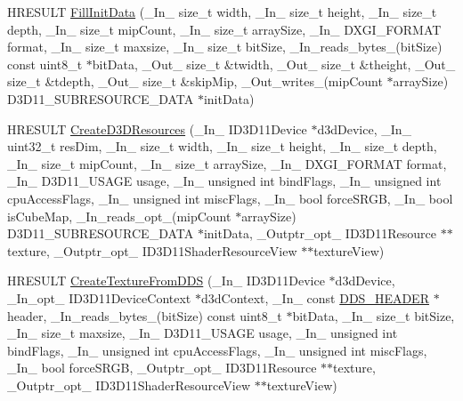 \begin{DoxyCompactItemize}
\item 
H\+R\+E\+S\+U\+LT \mbox{\hyperlink{namespaceanonymous__namespace_02dds__loader_8cpp_03_a1e6625f0f160c3b83ad3b703589fc33d}{Fill\+Init\+Data}} (\+\_\+\+In\+\_\+ size\+\_\+t width, \+\_\+\+In\+\_\+ size\+\_\+t height, \+\_\+\+In\+\_\+ size\+\_\+t depth, \+\_\+\+In\+\_\+ size\+\_\+t mip\+Count, \+\_\+\+In\+\_\+ size\+\_\+t array\+Size, \+\_\+\+In\+\_\+ D\+X\+G\+I\+\_\+\+F\+O\+R\+M\+AT format, \+\_\+\+In\+\_\+ size\+\_\+t maxsize, \+\_\+\+In\+\_\+ size\+\_\+t bit\+Size, \+\_\+\+In\+\_\+reads\+\_\+bytes\+\_\+(bit\+Size) const uint8\+\_\+t $\ast$bit\+Data, \+\_\+\+Out\+\_\+ size\+\_\+t \&twidth, \+\_\+\+Out\+\_\+ size\+\_\+t \&theight, \+\_\+\+Out\+\_\+ size\+\_\+t \&tdepth, \+\_\+\+Out\+\_\+ size\+\_\+t \&skip\+Mip, \+\_\+\+Out\+\_\+writes\+\_\+(mip\+Count $\ast$array\+Size) D3\+D11\+\_\+\+S\+U\+B\+R\+E\+S\+O\+U\+R\+C\+E\+\_\+\+D\+A\+TA $\ast$init\+Data)
\item 
H\+R\+E\+S\+U\+LT \mbox{\hyperlink{namespaceanonymous__namespace_02dds__loader_8cpp_03_a282ed1f7850afb5239d097b7404d968d}{Create\+D3\+D\+Resources}} (\+\_\+\+In\+\_\+ I\+D3\+D11\+Device $\ast$d3d\+Device, \+\_\+\+In\+\_\+ uint32\+\_\+t res\+Dim, \+\_\+\+In\+\_\+ size\+\_\+t width, \+\_\+\+In\+\_\+ size\+\_\+t height, \+\_\+\+In\+\_\+ size\+\_\+t depth, \+\_\+\+In\+\_\+ size\+\_\+t mip\+Count, \+\_\+\+In\+\_\+ size\+\_\+t array\+Size, \+\_\+\+In\+\_\+ D\+X\+G\+I\+\_\+\+F\+O\+R\+M\+AT format, \+\_\+\+In\+\_\+ D3\+D11\+\_\+\+U\+S\+A\+GE usage, \+\_\+\+In\+\_\+ unsigned int bind\+Flags, \+\_\+\+In\+\_\+ unsigned int cpu\+Access\+Flags, \+\_\+\+In\+\_\+ unsigned int misc\+Flags, \+\_\+\+In\+\_\+ bool force\+S\+R\+GB, \+\_\+\+In\+\_\+ bool is\+Cube\+Map, \+\_\+\+In\+\_\+reads\+\_\+opt\+\_\+(mip\+Count $\ast$array\+Size) D3\+D11\+\_\+\+S\+U\+B\+R\+E\+S\+O\+U\+R\+C\+E\+\_\+\+D\+A\+TA $\ast$init\+Data, \+\_\+\+Outptr\+\_\+opt\+\_\+ I\+D3\+D11\+Resource $\ast$$\ast$texture, \+\_\+\+Outptr\+\_\+opt\+\_\+ I\+D3\+D11\+Shader\+Resource\+View $\ast$$\ast$texture\+View)
\item 
H\+R\+E\+S\+U\+LT \mbox{\hyperlink{namespaceanonymous__namespace_02dds__loader_8cpp_03_adff875e15c4c1a87a13da9cf502b0b34}{Create\+Texture\+From\+D\+DS}} (\+\_\+\+In\+\_\+ I\+D3\+D11\+Device $\ast$d3d\+Device, \+\_\+\+In\+\_\+opt\+\_\+ I\+D3\+D11\+Device\+Context $\ast$d3d\+Context, \+\_\+\+In\+\_\+ const \mbox{\hyperlink{struct_d_d_s___h_e_a_d_e_r}{D\+D\+S\+\_\+\+H\+E\+A\+D\+ER}} $\ast$header, \+\_\+\+In\+\_\+reads\+\_\+bytes\+\_\+(bit\+Size) const uint8\+\_\+t $\ast$bit\+Data, \+\_\+\+In\+\_\+ size\+\_\+t bit\+Size, \+\_\+\+In\+\_\+ size\+\_\+t maxsize, \+\_\+\+In\+\_\+ D3\+D11\+\_\+\+U\+S\+A\+GE usage, \+\_\+\+In\+\_\+ unsigned int bind\+Flags, \+\_\+\+In\+\_\+ unsigned int cpu\+Access\+Flags, \+\_\+\+In\+\_\+ unsigned int misc\+Flags, \+\_\+\+In\+\_\+ bool force\+S\+R\+GB, \+\_\+\+Outptr\+\_\+opt\+\_\+ I\+D3\+D11\+Resource $\ast$$\ast$texture, \+\_\+\+Outptr\+\_\+opt\+\_\+ I\+D3\+D11\+Shader\+Resource\+View $\ast$$\ast$texture\+View)

\end{DoxyCompactItemize}

